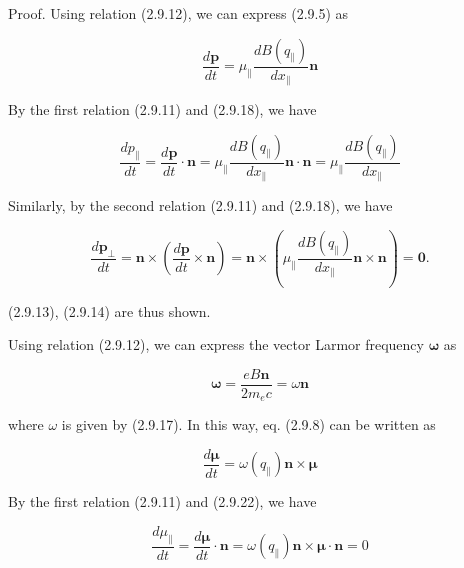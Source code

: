 \documentclass{article}
\begin{document}
Proof. Using relation (2.9.12), we can express (2.9.5) as
 
\begin{equation*}
\frac{d \boldsymbol{p}}{d t}=\mu_{\|} \frac{d B\left(q_{\|}\right)}{d x_{\|}} \boldsymbol{n} \tag{2.9.18}
\end{equation*}
 

By the first relation (2.9.11) and (2.9.18), we have
 
\begin{equation*}
\frac{d p_{\|}}{d t}=\frac{d \boldsymbol{p}}{d t} \cdot \boldsymbol{n}=\mu_{\|} \frac{d B\left(q_{\|}\right)}{d x_{\|}} \boldsymbol{n} \cdot \boldsymbol{n}=\mu_{\|} \frac{d B\left(q_{\|}\right)}{d x_{\|}} \tag{2.9.19}
\end{equation*}
 

Similarly, by the second relation (2.9.11) and (2.9.18), we have
 
\begin{equation*}
\frac{d \boldsymbol{p}_{\perp}}{d t}=\boldsymbol{n} \times\left(\frac{d \boldsymbol{p}}{d t} \times \boldsymbol{n}\right)=\boldsymbol{n} \times\left(\mu_{\|} \frac{d B\left(q_{\|}\right)}{d x_{\|}} \boldsymbol{n} \times \boldsymbol{n}\right)=\mathbf{0} . \tag{2.9.20}
\end{equation*}
 
(2.9.13), (2.9.14) are thus shown.

Using relation (2.9.12), we can express the vector Larmor frequency $\boldsymbol{\omega}$ as
 
\begin{equation*}
\boldsymbol{\omega}=\frac{e B \boldsymbol{n}}{2 m_{e} c}=\omega \boldsymbol{n} \tag{2.9.21}
\end{equation*}
 
where $\omega$ is given by (2.9.17). In this way, eq. (2.9.8) can be written as
 
\begin{equation*}
\frac{d \boldsymbol{\mu}}{d t}=\omega\left(q_{\|}\right) \boldsymbol{n} \times \boldsymbol{\mu} \tag{2.9.22}
\end{equation*}
 

By the first relation (2.9.11) and (2.9.22), we have
 
\begin{equation*}
\frac{d \mu_{\|}}{d t}=\frac{d \boldsymbol{\mu}}{d t} \cdot \boldsymbol{n}=\omega\left(q_{\|}\right) \boldsymbol{n} \times \boldsymbol{\mu} \cdot \boldsymbol{n}=0 \tag{2.9.23}
\end{equation*}
 
\end{document}
